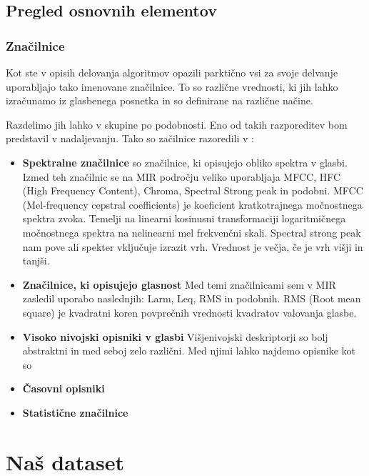 \documentclass[a4paper, 12pt]{book}
\begin{document}
{\section{Pregled osnovnih elementov}

\subsection{Značilnice}

Kot ste v opisih delovanja algoritmov opazili parktično vsi za svoje delvanje uporabljajo tako imenovane značilnice. To so različne vrednosti, ki jih lahko izračunamo iz glasbenega posnetka in so definirane na različne načine.

Razdelimo jih lahko v skupine po podobnosti. Eno od takih razporeditev bom predstavil v nadaljevanju. Tako so začilnice razoredili v \cite{laurier2007audio}:

\begin{itemize}
  \item \textbf{Spektralne značilnice} so značilnice, ki opisujejo obliko spektra v glasbi. Izmed teh značilnic se na MIR področju veliko uporabljaja MFCC, HFC (High Frequency Content), Chroma, Spectral Strong peak in podobni. 
MFCC \cite{gunderson2007musical} (Mel-frequency cepstral coefficients) je koeficient kratkotrajnega močnostnega spektra zvoka. Temelji na linearni kosinusni transformaciji logaritmičnega močnostnega spektra na nelinearni mel frekvenčni skali. Spectral strong peak \cite{gouyon2001exploration} nam pove ali spekter vključuje izrazit vrh. Vrednost je večja, če je vrh višji in tanjši. 
  \item \textbf{Značilnice, ki opisujejo glasnost} Med temi značilnicami sem v MIR zasledil uporabo naslednjih: Larm, Leq, RMS in podobnih. RMS (Root mean square) \cite{bausch1996root} je kvadratni koren povprečnih vrednosti kvadratov valovanja glasbe.
  \item \textbf{Visoko nivojski opisniki v glasbi} Višjenivojski deskriptorji so bolj abstraktni in med seboj zelo različni. Med njimi lahko najdemo opisnike kot so 
  \item \textbf{Časovni opisniki}
  \item \textbf{Statistične značilnice}
\end{itemize}

\chapter{Naš dataset}
\label{odatasetu}

}
\end{document}
